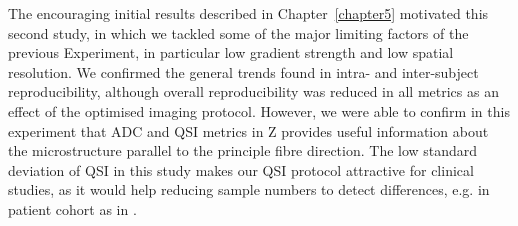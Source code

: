 The encouraging initial results described in Chapter~\ref{chapter5} motivated this second study, in which we tackled some of the major limiting factors of the previous Experiment, in particular low gradient strength and low spatial resolution. We confirmed the general trends found in intra- and inter-subject reproducibility, although overall reproducibility was reduced in all metrics as an effect of the optimised imaging protocol. However, we were able to confirm in this experiment that ADC and QSI metrics in Z provides useful information about the microstructure parallel to the principle fibre direction. The low standard deviation of QSI in this study makes our QSI protocol attractive for clinical studies, as it would help reducing sample numbers to detect differences, e.g. in patient cohort as in \citep{Farrell:2008}.



